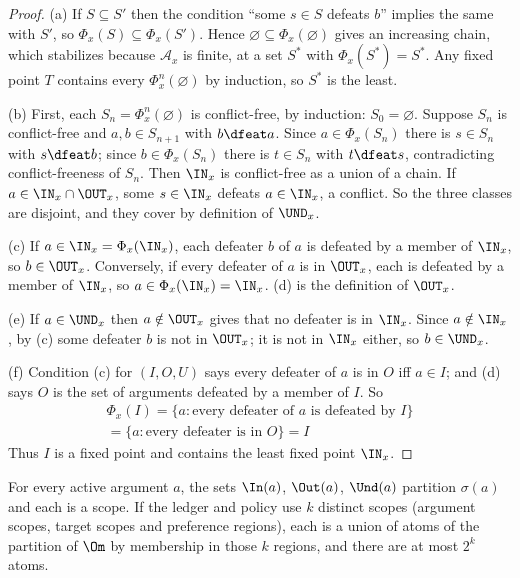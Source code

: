 \begin{proof}
(a) If $S\subseteq S'$ then the condition ``some $s\in S$ defeats $b$'' implies the same with $S'$, so $\Phi_x(S)\subseteq\Phi_x(S')$. Hence $\varnothing\subseteq\Phi_x(\varnothing)$ gives an increasing chain, which stabilizes because $\mathcal A_x$ is finite, at a set $S^*$ with $\Phi_x(S^*)=S^*$. Any fixed point $T$ contains every $\Phi_x^n(\varnothing)$ by induction, so $S^*$ is the least.

(b) First, each $S_n=\Phi_x^n(\varnothing)$ is conflict-free, by induction: $S_0=\varnothing$. Suppose $S_n$ is conflict-free and $a,b\in S_{n+1}$ with $b\dfeat a$. Since $a\in\Phi_x(S_n)$ there is $s\in S_n$ with $s\dfeat b$; since $b\in\Phi_x(S_n)$ there is $t\in S_n$ with $t\dfeat s$, contradicting conflict-freeness of $S_n$. Then $\IN_x$ is conflict-free as a union of a chain. If $a\in\IN_x\cap\OUT_x$, some $s\in\IN_x$ defeats $a\in\IN_x$, a conflict. So the three classes are disjoint, and they cover by definition of $\UND_x$.

(c) If $a\in\IN_x=\Phi_x(\IN_x)$, each defeater $b$ of $a$ is defeated by a member of $\IN_x$, so $b\in\OUT_x$. Conversely, if every defeater of $a$ is in $\OUT_x$, each is defeated by a member of $\IN_x$, so $a\in\Phi_x(\IN_x)=\IN_x$. (d) is the definition of $\OUT_x$.

(e) If $a\in\UND_x$ then $a\notin\OUT_x$ gives that no defeater is in $\IN_x$. Since $a\notin\IN_x$, by (c) some defeater $b$ is not in $\OUT_x$; it is not in $\IN_x$ either, so $b\in\UND_x$.

(f) Condition (c) for $(I,O,U)$ says every defeater of $a$ is in $O$ iff $a\in I$; and (d) says $O$ is the set of arguments defeated by a member of $I$. So \begin{multline*}\Phi_x(I)=\{a:\text{every defeater of }a\text{ is defeated by }I\}\\=\{a:\text{every defeater is in }O\}=I\end{multline*}
Thus $I$ is a fixed point and contains the least fixed point $\IN_x$.
\end{proof}

\begin{theorem}[Regions]\label{thm:regions}
For every active argument $a$, the sets $\In(a)$, $\Out(a)$, $\Und(a)$ partition $\sigma(a)$ and each is a scope. If the ledger and policy use $k$ distinct scopes (argument scopes, target scopes and preference regions), each is a union of atoms of the partition of $\Om$ by membership in those $k$ regions, and there are at most $2^k$ atoms.
\end{theorem}

